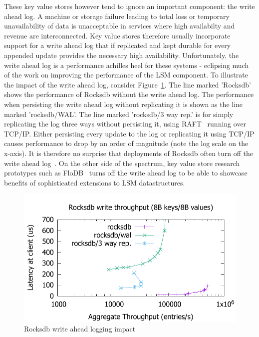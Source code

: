 \documentclass[pageno]{jpaper}
\begin{document}
These key value stores however tend to ignore an important component: the write
ahead log. A machine or storage failure leading to total loss or temporary
unavailability of data is unacceptable in services where high availabilty and
revenue are interconnected. Key value stores therefore usually incorporate
support for a write ahead log that if replicated and kept durable for every
appended update provides the necessary high availability. Unfortunately, the
write ahead log is a performance achilles heel for these systems - eclipsing
much of the work on improving the performance of the LSM component. To
illustrate the impact of the write ahead log, consider
Figure~\ref{fig:problem}. The line marked 'Rocksdb' shows the performance of
Rocksdb without the write ahead log. The performance when persisting the write
ahead log without replicating it is shown as the line marked 'rocksdb/WAL'. The
line marked 'rocksdb/3 way rep.' is for simply replicating the log three ways
without persisting it, using RAFT~\cite{raft} running over TCP/IP. Either
persisting every update to the log or replicating it using TCP/IP causes
performance to drop by an order of magnitude (note the log scale on the
x-axis). It is therefore no surprise that deployments of Rocksdb often turn off
the write ahead log~\cite{samza}. On the other side of the spectrum, key value
store research prototypes such as FloDB~\cite{flodb} turns off the write ahead
log to be able to showcase benefits of sophisticated extensions to LSM
datastructures.


\begin{figure}
\centering \includegraphics[scale=0.6]{results2/problem.pdf}
\caption{Rocksdb write ahead logging impact}
\label{fig:problem}
\end{figure}
\end{document}
